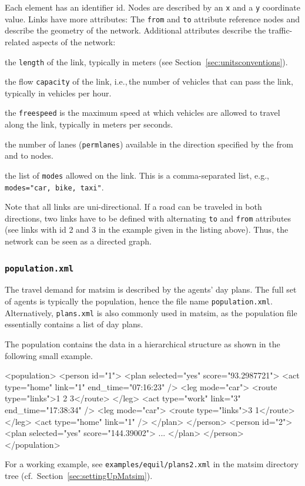 Each element has an identifier id. Nodes are described by an \lstinline|x| and a \lstinline|y| coordinate value. Links have more attributes: The \lstinline|from| and \lstinline|to| attribute reference nodes and describe the geometry of the network. Additional attributes describe the traffic-related aspects of the network:
\begin{compactitem}
    \item the \lstinline|length| of the link, typically in meters (see Section~\ref{sec:unitsconventions}).
    \item the flow \lstinline|capacity| of the link, i.e.,\,the number of vehicles that can pass the link, typically in vehicles per hour.
    \item the \lstinline|freespeed| is the maximum speed at which vehicles are allowed to travel along the link, typically in meters per seconds.
    \item the number of lanes (\lstinline|permlanes|) available in the direction specified by the from and to nodes.
    \item the list of \lstinline|modes| allowed on the link. This is a comma-separated list, e.g.,\,\lstinline|modes="car, bike, taxi"|.
\end{compactitem}
Note that all links are uni-directional. If a road can be traveled in both directions, two links have to be defined with alternating \lstinline|to| and \lstinline|from| attributes (see links with id 2 and 3 in the example given in the listing above). Thus, the network can be seen as a directed graph. 

\subsubsection{\lstinline|population.xml|}
The travel demand for \gls{matsim} is described by the agents' day plans. The full set of agents is typically the population, hence the file name \lstinline|population.xml|. Alternatively, \lstinline|plans.xml| is also commonly used in \gls{matsim}, as the population file essentially contains a list of day plans.

The population contains the data in a hierarchical structure as shown in the following small example.
\begin{xml}
<population> 
   <person id="1"> 
      <plan selected="yes" score="93.2987721"> 
         <act type="home" link="1" end_time="07:16:23" /> 
         <leg mode="car"> 
            <route type="links">1 2 3</route> 
         </leg> 
         <act type="work" link="3" end_time="17:38:34" /> 
         <leg mode="car"> 
            <route type="links">3 1</route> 
         </leg> 
         <act type="home" link="1" /> 
      </plan> 
   </person> 
   <person id="2"> 
      <plan selected="yes" score="144.39002"> 
         ...
      </plan> 
   </person> 
</population>
\end{xml}
For a working example, see \lstinline{examples/equil/plans2.xml} in the \gls{matsim} directory tree (cf.\ Section~\ref{sec:settingUpMatsim}).

